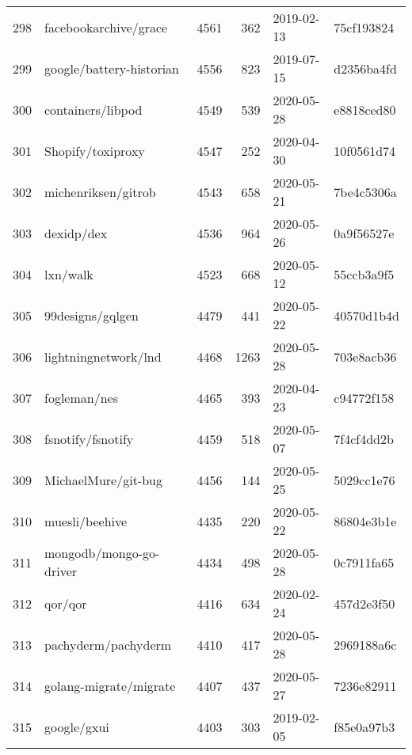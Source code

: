 \begin{longtable}{llrrll}
    298 &                              facebookarchive/grace &   4561 &    362 & 2019-02-13 &  75cf193824 \\
    299 &                           google/battery-historian &   4556 &    823 & 2019-07-15 &  d2356ba4fd \\
    300 &                                  containers/libpod &   4549 &    539 & 2020-05-28 &  e8818ced80 \\
    301 &                                  Shopify/toxiproxy &   4547 &    252 & 2020-04-30 &  10f0561d74 \\
    302 &                                michenriksen/gitrob &   4543 &    658 & 2020-05-21 &  7be4c5306a \\
    303 &                                         dexidp/dex &   4536 &    964 & 2020-05-26 &  0a9f56527e \\
    304 &                                           lxn/walk &   4523 &    668 & 2020-05-12 &  55ccb3a9f5 \\
    305 &                                   99designs/gqlgen &   4479 &    441 & 2020-05-22 &  40570d1b4d \\
    306 &                               lightningnetwork/lnd &   4468 &   1263 & 2020-05-28 &  703e8acb36 \\
    307 &                                       fogleman/nes &   4465 &    393 & 2020-04-23 &  c94772f158 \\
    308 &                                  fsnotify/fsnotify &   4459 &    518 & 2020-05-07 &  7f4cf4dd2b \\
    309 &                                MichaelMure/git-bug &   4456 &    144 & 2020-05-25 &  5029cc1e76 \\
    310 &                                     muesli/beehive &   4435 &    220 & 2020-05-22 &  86804e3b1e \\
    311 &                            mongodb/mongo-go-driver &   4434 &    498 & 2020-05-28 &  0c7911fa65 \\
    312 &                                            qor/qor &   4416 &    634 & 2020-02-24 &  457d2e3f50 \\
    313 &                                pachyderm/pachyderm &   4410 &    417 & 2020-05-28 &  2969188a6c \\
    314 &                             golang-migrate/migrate &   4407 &    437 & 2020-05-27 &  7236e82911 \\
    315 &                                        google/gxui &   4403 &    303 & 2019-02-05 &  f85e0a97b3 \\

\end{longtable}

